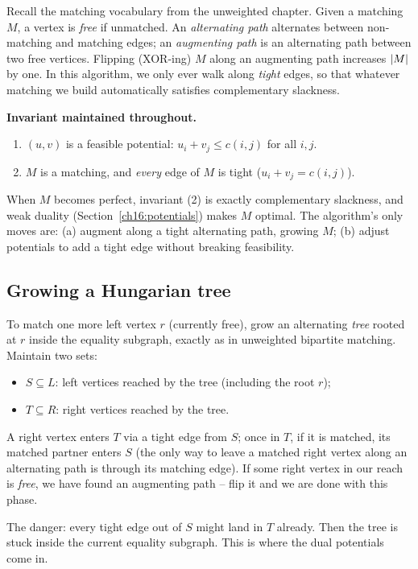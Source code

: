 Recall the matching vocabulary from the unweighted chapter. Given a matching $M$, a vertex is \emph{free} if unmatched. An \emph{alternating path} alternates between non-matching and matching edges; an \emph{augmenting path} is an alternating path between two free vertices. Flipping (XOR-ing) $M$ along an augmenting path increases $\lvert M\rvert$ by one. In this algorithm, we only ever walk along \emph{tight} edges, so that whatever matching we build automatically satisfies complementary slackness.

\begin{focusbox}
\textbf{Invariant maintained throughout.}
\begin{enumerate}
  \item $(u,v)$ is a feasible potential: $u_i+v_j\le c(i,j)$ for all $i,j$.
  \item $M$ is a matching, and \emph{every} edge of $M$ is tight ($u_i+v_j=c(i,j)$).
\end{enumerate}
When $M$ becomes perfect, invariant (2) is exactly complementary slackness, and weak duality (Section~\ref{ch16:potentials}) makes $M$ optimal. The algorithm's only moves are: (a) augment along a tight alternating path, growing $M$; (b) adjust potentials to add a tight edge without breaking feasibility.
\end{focusbox}

\subsection{Growing a Hungarian tree}

To match one more left vertex $r$ (currently free), grow an alternating \emph{tree} rooted at $r$ inside the equality subgraph, exactly as in unweighted bipartite matching. Maintain two sets:
\begin{itemize}
  \item $S\subseteq L$: left vertices reached by the tree (including the root $r$);
  \item $T\subseteq R$: right vertices reached by the tree.
\end{itemize}
A right vertex enters $T$ via a tight edge from $S$; once in $T$, if it is matched, its matched partner enters $S$ (the only way to leave a matched right vertex along an alternating path is through its matching edge). If some right vertex in our reach is \emph{free}, we have found an augmenting path -- flip it and we are done with this phase.

The danger: every tight edge out of $S$ might land in $T$ already. Then the tree is stuck inside the current equality subgraph. This is where the dual potentials come in.

